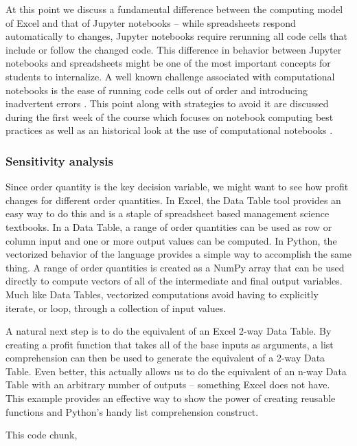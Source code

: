 \documentclass[ited,blindrev]{informs3}              %
\begin{document}
At this point we discuss a fundamental difference between the computing model of Excel and that of Jupyter notebooks -- while spreadsheets respond automatically to changes, Jupyter notebooks require rerunning all code cells that include or follow the changed code. This difference in behavior between Jupyter notebooks and spreadsheets might be one of the most important concepts for students to internalize. A well known challenge associated with computational notebooks is the ease of running code cells out of order and introducing inadvertent errors \cite{bibid}. This point along with strategies to avoid it are discussed during the first week of the course which focuses on notebook computing best practices as well as an historical look at the use of computational notebooks \cite{bibid}.

\subsubsection{Sensitivity analysis}

Since order quantity is the key decision variable, we might want to see how profit changes for different order quantities. In Excel, the Data Table tool provides an easy way to do this and is a staple of spreadsheet based management science textbooks. In a Data Table, a range of order quantities can be used as row or column input and one or more output values can be computed. In Python, the vectorized behavior of the language \cite{bibid} provides a simple way to accomplish the same thing. A range of order quantities is created as a NumPy array that can be used directly to compute vectors of all of the intermediate and final output variables. Much like Data Tables, vectorized computations avoid having to explicitly iterate, or loop, through a collection of input values.

A natural next step is to do the equivalent of an Excel 2-way Data Table. By creating a profit function that takes all of the base inputs as arguments, a list comprehension can then be used to generate the equivalent of a 2-way Data Table. Even better, this actually allows us to do the equivalent of an n-way Data Table with an arbitrary number of outputs -- something Excel does not have. This example provides an effective way to show the power of creating reusable functions and Python's handy list comprehension construct.

This code chunk,
\end{document}
